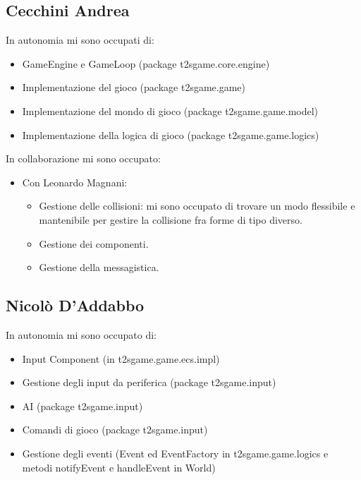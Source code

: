 \documentclass[a4paper,12pt]{report}
\begin{document}
\subsection*{Cecchini Andrea}
In autonomia mi sono occupati di:
\begin{itemize}
	\item GameEngine e GameLoop (package t2sgame.core.engine)
	\item Implementazione del gioco (package t2sgame.game)
	\item Implementazione del mondo di gioco (package t2sgame.game.model)
	\item Implementazione della logica di gioco (package t2sgame.game.logics)
\end{itemize}
In collaborazione mi sono occupato:
\begin{itemize}
	\item Con Leonardo Magnani:
		\begin{itemize}
			\item Gestione delle collisioni: mi sono occupato di trovare un modo flessibile e mantenibile per gestire la collisione fra forme di tipo diverso.
			\item Gestione dei componenti.
			\item Gestione della messagistica.
		\end{itemize}
\end{itemize}
\subsection*{Nicolò D'Addabbo}
In autonomia mi sono occupato di:
\begin{itemize}
\item Input Component (in t2sgame.game.ecs.impl)
\item Gestione degli input da periferica (package t2sgame.input)
\item AI (package t2sgame.input)
\item Comandi di gioco (package t2sgame.input)
\item Gestione degli eventi (Event ed EventFactory in t2sgame.game.logics e metodi notifyEvent e handleEvent in World)
\end{itemize}
\end{document}
